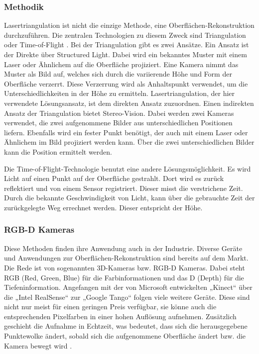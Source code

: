 		\subsubsection{Methodik}
		Lasertriangulation ist nicht die einzige Methode, eine Oberflächen-Rekonstruktion durchzuführen. Die zentralen Technologien zu diesem Zweck sind Triangulation oder Time-of-Flight \citep[vgl.][]{state_of_art_zoll}. 
		Bei der Triangulation gibt es zwei Ansätze. Ein Ansatz ist der Direkte über Structured Light. Dabei wird ein bekanntes Muster mit einem Laser oder Ähnlichem auf die Oberfläche projiziert. Eine Kamera nimmt das Muster als Bild auf, welches sich durch die variierende Höhe und Form der Oberfläche verzerrt. Diese Verzerrung wird als Anhaltspunkt verwendet, um die Unterschiedlichkeiten in der Höhe zu ermitteln. Lasertriangulation, der hier verwendete Lösungsansatz, ist dem direkten Ansatz zuzuordnen. \newline
		Einen indirekten Ansatz der Triangulation bietet Stereo-Vision. Dabei werden zwei Kameras verwendet, die zwei aufgenommene Bilder aus unterschiedlichen Positionen liefern. Ebenfalls wird ein fester Punkt benötigt, der auch mit einem Laser oder Ähnlichem im Bild projiziert werden kann. Über die zwei unterschiedlichen Bilder kann die Position ermittelt werden.
		
		Die Time-of-Flight-Technologie benutzt eine andere Lösungsmöglichkeit. Es wird Licht auf einen Punkt auf der Oberfläche gestrahlt. Dort wird es zurück reflektiert und von einem Sensor registriert. Dieser misst die verstrichene Zeit. Durch die bekannte Geschwindigkeit von Licht, kann über die gebrauchte Zeit der zurückgelegte Weg errechnet werden. Dieser entspricht der Höhe.
	
		\subsubsection{RGB-D Kameras}
		Diese Methoden finden ihre Anwendung auch in der Industrie. Diverse Geräte und Anwendungen zur Oberflächen-Rekonstruktion sind bereits auf dem Markt. Die Rede ist von sogenannten 3D-Kameras bzw. RGB-D Kameras. Dabei steht RGB (Red, Green, Blue) für die Farbinformationen und das D (Depth) für die Tiefeninformation. Angefangen mit der von Microsoft entwickelten „Kinect“ über die „Intel RealSense“ zur „Google Tango“ folgen viele weitere Geräte. Diese sind nicht nur meist für einen geringen Preis verfügbar, sie könne auch die entsprechenden Pixelfarben in einer hohen Auflösung aufnehmen.
		Zusätzlich geschieht die Aufnahme in Echtzeit, was bedeutet, dass sich die herausgegebene Punktewolke ändert, sobald sich die aufgenommene Oberfläche ändert bzw. die Kamera bewegt wird \citep[vgl.][]{state_of_art_zoll}.
		
